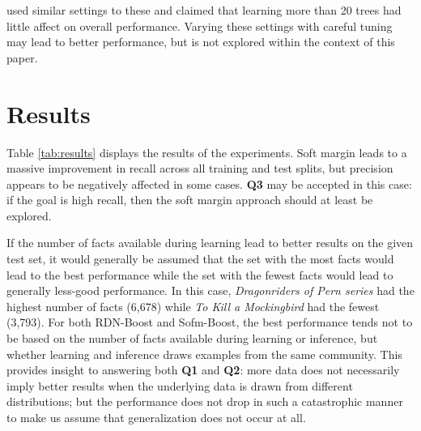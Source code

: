 \documentclass[letterpaper]{article}
\begin{document}
\cite{yang2017combining} used similar settings to these and claimed that learning more than 20 trees had little affect on overall performance. Varying these settings with careful tuning may lead to better performance, but is not explored within the context of this paper.

\section{Results}


Table \ref{tab:results} displays the results of the experiments. Soft margin leads to a massive improvement in recall across all training and test splits, but precision appears to be negatively affected in some cases. \textbf{Q3} may be accepted in this case: if the goal is high recall, then the soft margin approach should at least be explored.

If the number of facts available during learning lead to better results on the given test set, it would generally be assumed that the set with the most facts would lead to the best performance while the set with the fewest facts would lead to generally less-good performance. In this case, \textit{Dragonriders of Pern series} had the highest number of facts (6,678) while \textit{To Kill a Mockingbird} had the fewest (3,793). For both RDN-Boost and Sofm-Boost, the best performance tends not to be based on the number of facts available during learning or inference, but whether learning and inference draws examples from the same community. This provides insight to answering both \textbf{Q1} and \textbf{Q2}: more data does not necessarily imply better results when the underlying data is drawn from different distributions; but the performance does not drop in such a catastrophic manner to make us assume that generalization does not occur at all.
\end{document}

